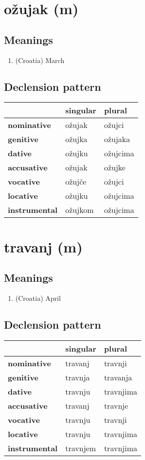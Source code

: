 \filbreak
\section{ožujak (m)}
\subsection*{Meanings}
\begin{enumerate}
\item (Croatia) March
\end{enumerate}
\subsection*{Declension pattern}
\begin{tabularx}{\linewidth}{Xll}
\toprule
{} & singular &    plural \\
\midrule
\textbf{nominative  } &   ožujak &    ožujci \\
\textbf{genitive    } &   ožujka &   ožujaka \\
\textbf{dative      } &   ožujku &  ožujcima \\
\textbf{accusative  } &   ožujak &    ožujke \\
\textbf{vocative    } &   ožujče &    ožujci \\
\textbf{locative    } &   ožujku &  ožujcima \\
\textbf{instrumental} &  ožujkom &  ožujcima \\
\bottomrule
\end{tabularx}

\filbreak
\section{travanj (m)}
\subsection*{Meanings}
\begin{enumerate}
\item (Croatia) April
\end{enumerate}
\subsection*{Declension pattern}
\begin{tabularx}{\linewidth}{Xll}
\toprule
{} &  singular &     plural \\
\midrule
\textbf{nominative  } &   travanj &    travnji \\
\textbf{genitive    } &   travnja &   travanja \\
\textbf{dative      } &   travnju &  travnjima \\
\textbf{accusative  } &   travanj &    travnje \\
\textbf{vocative    } &   travnju &    travnji \\
\textbf{locative    } &   travnju &  travnjima \\
\textbf{instrumental} &  travnjem &  travnjima \\
\bottomrule
\end{tabularx}

